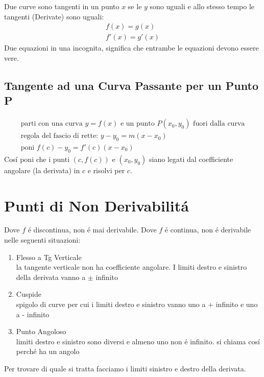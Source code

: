 \documentclass{article}
\begin{document}
Due curve sono tangenti in un punto $x$ se le $y$ sono uguali e allo stesso tempo le tangenti (Derivate) sono uguali:
\begin{gather*}
    f(x)=g(x)\\
    f'(x)=g'(x)
\end{gather*}
Due equazioni in una incognita, significa che entrambe le equazioni devono essere vere.
\subsection{Tangente ad una Curva Passante per un Punto P}
\begin{gather*}
    \text{parti con una curva $y=f(x)$ e un punto $P(x_0,y_0)$ fuori dalla curva}\\
    \text{regola del fascio di rette: }
    y-y_0=m(x-x_0)\\
    \text{poni }f(c)-y_0=f'(c)(x-x_0)
\end{gather*}
Cosí poni che i punti $(c,f(c))$ e $(x_0,y_0)$ siano legati dal coefficiente angolare (la derivata) in $c$ e risolvi per $c$.
\section{Punti di Non Derivabilitá}
Dove $f$ é discontinua, non é mai derivabile. Dove $f$ é continua, non é derivabile nelle seguenti situazioni:
\begin{enumerate}
    \item Flesso a Tg Verticale\\
    la tangente verticale non ha coefficiente angolare. I limiti destro e sinistro della derivata vanno a $\pm$ infinito
    \item Cuspide\\
    spigolo di curve per cui i limiti destro e sinistro vanno uno a + infinito e uno a - infinito
    \item Punto Angoloso\\
    limiti destro e sinistro sono diversi e almeno uno non é infinito. si chiama cosí perché ha un angolo
\end{enumerate}
Per trovare di quale si tratta facciamo i limiti sinistro e destro della derivata.
\end{document}
